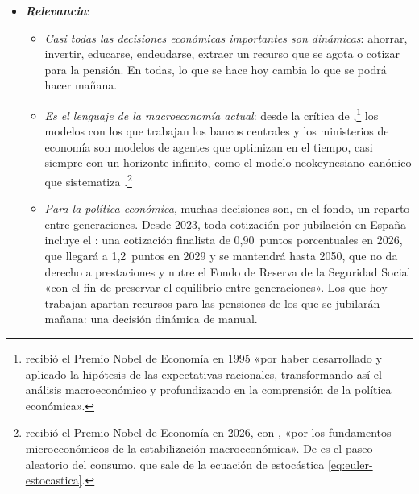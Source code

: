 \documentclass[11pt]{article}
\begin{document}
\begin{itemize}
\item \textbf{\emph{Relevancia}}:
  \begin{itemize}
  \item \emph{Casi todas las decisiones económicas importantes son dinámicas}: ahorrar, invertir, educarse, endeudarse, extraer un recurso que se agota o cotizar para la pensión. En todas, lo que se hace hoy cambia lo que se podrá hacer mañana.
  \item \emph{Es el lenguaje de la macroeconomía actual}: desde la crítica de ,\footnote{ recibió el Premio Nobel de Economía en 1995 «por haber desarrollado y aplicado la hipótesis de las expectativas racionales, transformando así el análisis macroeconómico y profundizando en la comprensión de la política económica»\nocite{Nobel1995Lucas}.} los modelos con los que trabajan los bancos centrales y los ministerios de economía son modelos de agentes que optimizan en el tiempo, casi siempre con un horizonte infinito, como el modelo neokeynesiano canónico que sistematiza \textcite{Woodford2003Interest}.\footnote{ recibió el Premio Nobel de Economía en 2026, con , «por los fundamentos microeconómicos de la estabilización macroeconómica»\nocite{Nobel2026Prensa}. De  es el paseo aleatorio del consumo, que sale de la ecuación de  estocástica \eqref{eq:euler-estocastica}.}
  \item \emph{Para la política económica}, muchas decisiones son, en el fondo, un reparto entre generaciones. Desde 2023, toda cotización por jubilación en España incluye el : una cotización finalista de 0,90~puntos porcentuales en 2026, que llegará a 1,2~puntos en 2029 y se mantendrá hasta 2050, que no da derecho a prestaciones y nutre el Fondo de Reserva de la Seguridad Social «con el fin de preservar el equilibrio entre generaciones»\nocite{BOE2015LGSS}. Los que hoy trabajan apartan recursos para las pensiones de los que se jubilarán mañana: una decisión dinámica de manual.
  \end{itemize}


\end{itemize}
\end{document}
